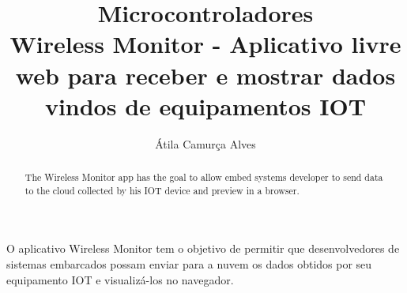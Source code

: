 \documentclass[a4paper,12pt]{article}
\title{Microcontroladores\\Wireless Monitor - Aplicativo livre web para receber e mostrar dados vindos de equipamentos IOT}
\author{Átila Camurça Alves}
\begin{document}
\maketitle

\begin{abstract}
  The Wireless Monitor app has the goal to allow embed systems developer
  to send data to the cloud collected by his IOT device and preview in a
  browser.
\end{abstract}
     
\begin{resumo}
  O aplicativo Wireless Monitor tem o objetivo de permitir que
  desenvolvedores de sistemas embarcados possam enviar para a nuvem
  os dados obtidos por seu equipamento IOT e visualizá-los no navegador.
\end{resumo}





\end{document}
